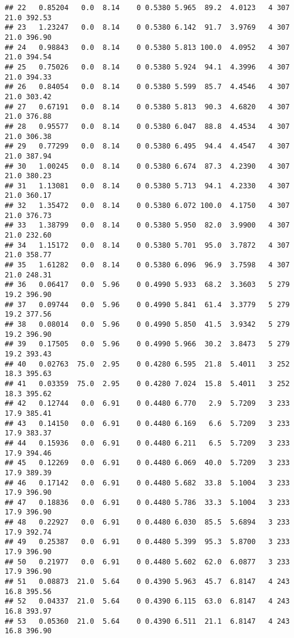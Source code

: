 \documentclass[
]{article}
\begin{document}
\begin{verbatim}
## 22   0.85204   0.0  8.14    0 0.5380 5.965  89.2  4.0123   4 307    21.0 392.53
## 23   1.23247   0.0  8.14    0 0.5380 6.142  91.7  3.9769   4 307    21.0 396.90
## 24   0.98843   0.0  8.14    0 0.5380 5.813 100.0  4.0952   4 307    21.0 394.54
## 25   0.75026   0.0  8.14    0 0.5380 5.924  94.1  4.3996   4 307    21.0 394.33
## 26   0.84054   0.0  8.14    0 0.5380 5.599  85.7  4.4546   4 307    21.0 303.42
## 27   0.67191   0.0  8.14    0 0.5380 5.813  90.3  4.6820   4 307    21.0 376.88
## 28   0.95577   0.0  8.14    0 0.5380 6.047  88.8  4.4534   4 307    21.0 306.38
## 29   0.77299   0.0  8.14    0 0.5380 6.495  94.4  4.4547   4 307    21.0 387.94
## 30   1.00245   0.0  8.14    0 0.5380 6.674  87.3  4.2390   4 307    21.0 380.23
## 31   1.13081   0.0  8.14    0 0.5380 5.713  94.1  4.2330   4 307    21.0 360.17
## 32   1.35472   0.0  8.14    0 0.5380 6.072 100.0  4.1750   4 307    21.0 376.73
## 33   1.38799   0.0  8.14    0 0.5380 5.950  82.0  3.9900   4 307    21.0 232.60
## 34   1.15172   0.0  8.14    0 0.5380 5.701  95.0  3.7872   4 307    21.0 358.77
## 35   1.61282   0.0  8.14    0 0.5380 6.096  96.9  3.7598   4 307    21.0 248.31
## 36   0.06417   0.0  5.96    0 0.4990 5.933  68.2  3.3603   5 279    19.2 396.90
## 37   0.09744   0.0  5.96    0 0.4990 5.841  61.4  3.3779   5 279    19.2 377.56
## 38   0.08014   0.0  5.96    0 0.4990 5.850  41.5  3.9342   5 279    19.2 396.90
## 39   0.17505   0.0  5.96    0 0.4990 5.966  30.2  3.8473   5 279    19.2 393.43
## 40   0.02763  75.0  2.95    0 0.4280 6.595  21.8  5.4011   3 252    18.3 395.63
## 41   0.03359  75.0  2.95    0 0.4280 7.024  15.8  5.4011   3 252    18.3 395.62
## 42   0.12744   0.0  6.91    0 0.4480 6.770   2.9  5.7209   3 233    17.9 385.41
## 43   0.14150   0.0  6.91    0 0.4480 6.169   6.6  5.7209   3 233    17.9 383.37
## 44   0.15936   0.0  6.91    0 0.4480 6.211   6.5  5.7209   3 233    17.9 394.46
## 45   0.12269   0.0  6.91    0 0.4480 6.069  40.0  5.7209   3 233    17.9 389.39
## 46   0.17142   0.0  6.91    0 0.4480 5.682  33.8  5.1004   3 233    17.9 396.90
## 47   0.18836   0.0  6.91    0 0.4480 5.786  33.3  5.1004   3 233    17.9 396.90
## 48   0.22927   0.0  6.91    0 0.4480 6.030  85.5  5.6894   3 233    17.9 392.74
## 49   0.25387   0.0  6.91    0 0.4480 5.399  95.3  5.8700   3 233    17.9 396.90
## 50   0.21977   0.0  6.91    0 0.4480 5.602  62.0  6.0877   3 233    17.9 396.90
## 51   0.08873  21.0  5.64    0 0.4390 5.963  45.7  6.8147   4 243    16.8 395.56
## 52   0.04337  21.0  5.64    0 0.4390 6.115  63.0  6.8147   4 243    16.8 393.97
## 53   0.05360  21.0  5.64    0 0.4390 6.511  21.1  6.8147   4 243    16.8 396.90

\end{verbatim}
\end{document}
